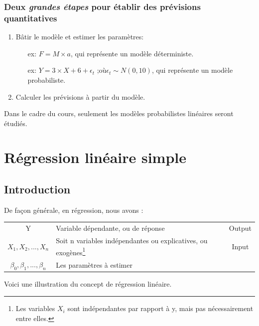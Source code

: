 \documentclass[11pt,french]{report}
\begin{document}
\subsection*{Deux \textit{grandes étapes} pour établir des prévisions quantitatives}
\begin{enumerate}
\item Bâtir le modèle et estimer les paramètres:
\begin{itemize}
\item[ex:] $F = M \times a$, qui représente un modèle déterministe.
\item[ex:] $Y =3 \times X + 6 + \epsilon_t \text{ ;où} \epsilon_t \sim N(0, 10)$, qui représente un modèle probabiliste.
\end{itemize}
\item Calculer les prévisions à partir du modèle.
\end{enumerate}

\bigskip
Dans le cadre du cours, seulement les modèles probabilistes linéaires seront étudiés. 

\chapter{Régression linéaire simple}
\label{chap:2}
\section{Introduction}

De façon générale, en régression, nous avons :

\begin{tabularx}{\linewidth}{c|X|c}
\hline
Y & Variable dépendante, ou de réponse & Output \\
\rowcolor{backcolour}
$X_1, X_2, ..., X_n$ & Soit n variables indépendantes ou explicatives, ou exogènes\footnote{Les variables $X_i$ sont indépendantes par rapport à y, mais pas nécessairement entre elles.} & Input \\
$\beta_0, \beta_1, ..., \beta_n$ & Les paramètres à estimer & \\
\hline
\end{tabularx}

\bigskip
\bigskip
Voici une illustration du concept de régression linéaire.
\bigskip
\end{document}
